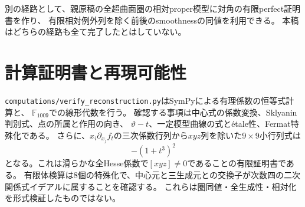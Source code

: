 別の経路として、親原稿の全超曲面圏の相対proper模型に対角の有限perfect証明書を作り、
有限相対例外列を除く前後のsmoothnessの同値を利用できる。
本稿はどちらの経路も全て完了したとはしていない。

\section{計算証明書と再現可能性}
\texttt{computations/verify\_reconstruction.py}はSymPyによる有理係数の恒等式計算と、
$\mathbb F_{1009}$での線形代数を行う。
確認する事項は中心式の係数変換、Sklyanin判別式、点の所属と作用の向き、
$\vartheta-t$、一定模型曲線の式とétale性、Fermat特殊化である。
さらに、$x_i\partial_{x_j}f_t$の三次係数行列から$xyz$列を除いた$9\times9$小行列式は
\[
 -(1+t^3)^2
\]
となる。これは滑らかな全Hesse係数で$[xyz]\ne0$であることの有限証明書である。
有限体検算は8個の特殊化で、中心元と三生成元との交換子が次数四の二次関係式イデアルに属することを確認する。
これらは圏同値・全生成性・相対化を形式検証したものではない。

